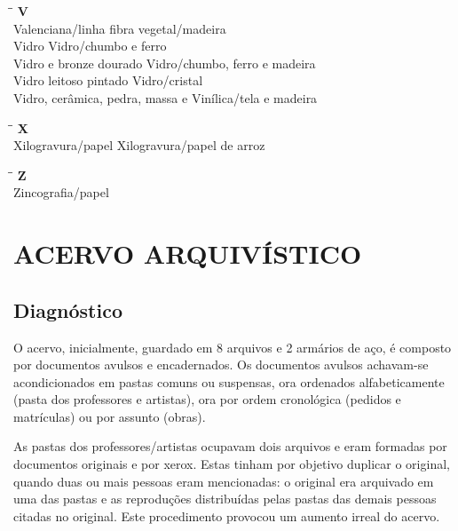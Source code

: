 \begin{tabbing}
	\hspace{8,7cm}\=\hspace{1cm}\=\kill
	\textbf{V} \>  \\ 
	Valenciana/linha	\> fibra vegetal/madeira\\
	Vidro \> Vidro/chumbo e ferro\\
	Vidro e bronze dourado	\> Vidro/chumbo, ferro e madeira\\
	Vidro leitoso pintado \> Vidro/cristal\\
	Vidro, cerâmica, pedra, massa e \> Vinílica/tela e madeira\\
\end{tabbing}

\begin{tabbing}
	\hspace{8,7cm}\=\hspace{1cm}\=\kill
	\textbf{X} \>  \\ 
	Xilogravura/papel	\> Xilogravura/papel de arroz\\
\end{tabbing}

\begin{tabbing}
	\hspace{8,7cm}\=\hspace{1cm}\=\kill
	\textbf{Z} \>  \\ 
	Zincografia/papel	\> \\
\end{tabbing}

\section{ACERVO ARQUIVÍSTICO}
\subsection{Diagnóstico}

O acervo, inicialmente, guardado em 8 arquivos e 2 armários de aço, é composto por documentos avulsos e encadernados. Os documentos avulsos achavam-se acondicionados em pastas comuns ou suspensas, ora ordenados alfabeticamente (pasta dos professores e artistas), ora por ordem cronológica (pedidos e matrículas) ou por assunto (obras).

As pastas dos professores/artistas ocupavam dois arquivos e eram formadas por documentos originais e por xerox. Estas tinham por objetivo duplicar o original, quando duas ou mais pessoas eram mencionadas: o original era arquivado em uma das pastas e as reproduções distribuídas pelas pastas das demais pessoas citadas no original. Este procedimento provocou um aumento irreal do acervo.

